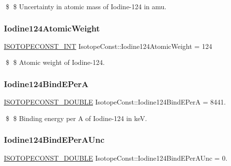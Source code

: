 \$ \$ Uncertainty in atomic mass of Iodine-\/124 in amu. \mbox{\label{group___isotope_const-_iodine-_i124_ga0d2933e7976fb17cbfafd8d483c3ea3d}} 
\subsubsection{\texorpdfstring{Iodine124\+Atomic\+Weight}{Iodine124AtomicWeight}}
{\footnotesize\ttfamily \mbox{\hyperlink{group___isotope_const-_macros_ga5f18360b3e99483a35c32d789e62621c}{I\+S\+O\+T\+O\+P\+E\+C\+O\+N\+S\+T\+\_\+\+I\+NT}} Isotope\+Const\+::\+Iodine124\+Atomic\+Weight = 124}

\$ \$ Atomic weight of Iodine-\/124. \mbox{\label{group___isotope_const-_iodine-_i124_ga69ac46ce7fab4cb6d4b78951be0d137b}} 
\subsubsection{\texorpdfstring{Iodine124\+Bind\+E\+PerA}{Iodine124BindEPerA}}
{\footnotesize\ttfamily \mbox{\hyperlink{group___isotope_const-_macros_ga8f45a7272ce02c0b4c65c44636ed719a}{I\+S\+O\+T\+O\+P\+E\+C\+O\+N\+S\+T\+\_\+\+D\+O\+U\+B\+LE}} Isotope\+Const\+::\+Iodine124\+Bind\+E\+PerA = 8441.}

\$ \$ Binding energy per A of Iodine-\/124 in keV. \mbox{\label{group___isotope_const-_iodine-_i124_ga48989b6d994f29a8ae6f7e09119080ef}} 
\subsubsection{\texorpdfstring{Iodine124\+Bind\+E\+Per\+A\+Unc}{Iodine124BindEPerAUnc}}
{\footnotesize\ttfamily \mbox{\hyperlink{group___isotope_const-_macros_ga8f45a7272ce02c0b4c65c44636ed719a}{I\+S\+O\+T\+O\+P\+E\+C\+O\+N\+S\+T\+\_\+\+D\+O\+U\+B\+LE}} Isotope\+Const\+::\+Iodine124\+Bind\+E\+Per\+A\+Unc = 0.}

